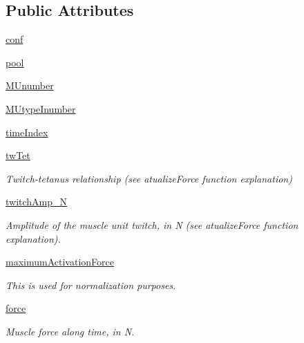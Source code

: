 \subsection*{Public Attributes}
\begin{DoxyCompactItemize}
\item 
\hyperlink{classjoint_ankle_position_task_1_1joint_ankle_position_task_af106c2701a40941b1ad8cf82d6866cab}{conf}
\item 
\hyperlink{classjoint_ankle_position_task_1_1joint_ankle_position_task_aa8fb50eedd13b19ba31c9ddf38b8a32c}{pool}
\item 
\hyperlink{classjoint_ankle_position_task_1_1joint_ankle_position_task_ac1b0fcb61f40d743f316a80553cad3f4}{M\+Unumber}
\item 
\hyperlink{classjoint_ankle_position_task_1_1joint_ankle_position_task_a242bf5621b3cf0cd557f985a7b13bbc2}{M\+Utype\+Inumber}
\item 
\hyperlink{classjoint_ankle_position_task_1_1joint_ankle_position_task_ab1f158fc2dc6c087ecf7e5578346b20f}{time\+Index}
\item 
\hyperlink{classjoint_ankle_position_task_1_1joint_ankle_position_task_adfb1cc9079bd72286725db5972e11ee7}{tw\+Tet}
\begin{DoxyCompactList}\small\item\em Twitch-\/tetanus relationship (see atualize\+Force function explanation) \end{DoxyCompactList}\item 
\hyperlink{classjoint_ankle_position_task_1_1joint_ankle_position_task_a2bf7ec4c6e53b71c6129f86059321cb2}{twitch\+Amp\+\_\+N}
\begin{DoxyCompactList}\small\item\em Amplitude of the muscle unit twitch, in N (see atualize\+Force function explanation). \end{DoxyCompactList}\item 
\hyperlink{classjoint_ankle_position_task_1_1joint_ankle_position_task_a4f36a115acf205a4fe25d29f3e7a4196}{maximum\+Activation\+Force}
\begin{DoxyCompactList}\small\item\em This is used for normalization purposes. \end{DoxyCompactList}\item 
\hyperlink{classjoint_ankle_position_task_1_1joint_ankle_position_task_a4eebc760c7522dcea949a1284e9f5d2a}{force}
\begin{DoxyCompactList}\small\item\em Muscle force along time, in N. \end{DoxyCompactList}\item 

\end{DoxyCompactItemize}
